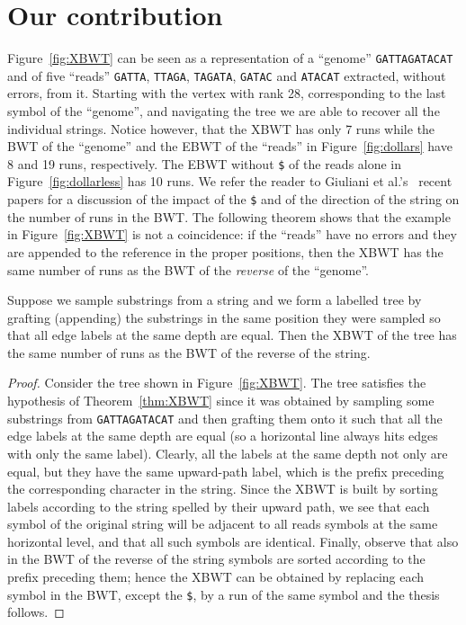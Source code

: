 \section{Our contribution} \label{xbwt:sec:main}

{Figure~\ref{fig:XBWT} can be seen as a representation of a ``genome''  {\tt GATTAGATACAT} and of five ``reads'' {\tt GATTA}, {\tt TTAGA}, {\tt TAGATA}, {\tt GATAC} and {\tt ATACAT} extracted, without errors, from it. Starting with the vertex with rank 28, corresponding to the last symbol of the ``genome'', and navigating the tree we are able to recover all the individual strings.  Notice however, that the XBWT has only 7 runs while the BWT of the ``genome'' and the EBWT of the ``reads'' in Figure~\ref{fig:dollars} have 8 and 19 runs, respectively. The EBWT without {\tt \$} of the reads alone in Figure~\ref{fig:dollarless} has 10 runs. We refer the reader to Giuliani et al.'s~\cite{10.1007/978-3-030-67731-2_18,giuliani2019dollar} recent papers for a discussion of the impact of the {\tt \$} and of the direction of the string on the number of runs in the BWT. The following theorem shows that the example in  Figure~\ref{fig:XBWT} is not a coincidence: if the ``reads'' have no errors and they are appended to the reference in the proper positions, then the XBWT has the same number of runs as the BWT of the {\it reverse} of the ``genome''.} 




\begin{theorem}\label{thm:XBWT}
Suppose we sample substrings from a string and we form a labelled tree by grafting (appending) the substrings in the same position they were sampled so that all edge labels at the same depth are equal. Then the XBWT of the tree has the same number of runs as the BWT of the reverse of the string.
\end{theorem}

\begin{proof} 
Consider the tree shown in Figure~\ref{fig:XBWT}.  The tree satisfies the hypothesis of Theorem~\ref{thm:XBWT} since it was obtained by sampling some substrings from {\tt GATTAGATACAT} and then grafting them onto it such that all the edge labels at the same depth are equal  (so a horizontal line always hits edges with only the same label). Clearly, all the labels at the same depth not only are equal, but they have the same upward-path label, which is the prefix preceding the corresponding character in the string. {Since the XBWT is built by sorting labels according to the string spelled by their upward path, we see that each symbol of the original string will be adjacent to all reads symbols at the same horizontal level, and that all such symbols are identical. Finally, observe that also in the BWT of the reverse of the string symbols are sorted according to the prefix preceding them; hence the XBWT can be obtained by replacing each symbol in the BWT, except the {\tt \$}, by a run of the same symbol and the thesis follows.}
\end{proof}


